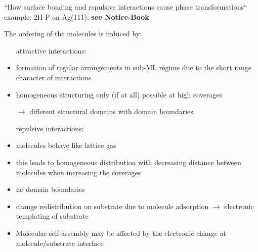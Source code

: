 ``How surface bonding and repulsive interactions cause phase transformations`` 
example: 2H-P on Ag(111): \textbf{see Notice-Book}

The ordering of the molecules is induced by:
\begin{itemize}
 \item [attractive interactions:]
 \item formation of regular arrangements in sub-ML regime due to the short range character of interactions
 \item homogeneous structuring only (if at all) possible at high coverages
 \item [$\rightarrow$] different structural domains with domain boundaries
 \item [repulsive interactions:]
 \item molecules behave like lattice gas
 \item this leads to homogeneous distribution with decreasing distance between molecules when increasing the coverages
 \item no domain boundaries
 \item change redistribution on substrate due to molecule adsorption $\rightarrow$ electronic templating of substrate
 \item Molecular self-assembly may be affected by the electronic change at molecule/substrate interface
\end{itemize}





